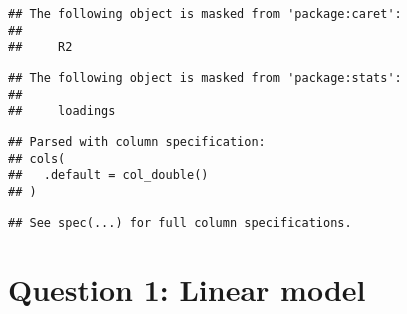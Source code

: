 \documentclass[
]{article}
\newenvironment{Shaded}{\begin{snugshade}}{\end{snugshade}}
\newcommand{\CommentTok}[1]{\textcolor[rgb]{0.56,0.35,0.01}{\textit{#1}}}
\newcommand{\DecValTok}[1]{\textcolor[rgb]{0.00,0.00,0.81}{#1}}
\newcommand{\KeywordTok}[1]{\textcolor[rgb]{0.13,0.29,0.53}{\textbf{#1}}}
\newcommand{\NormalTok}[1]{#1}
\newcommand{\OperatorTok}[1]{\textcolor[rgb]{0.81,0.36,0.00}{\textbf{#1}}}
\newcommand{\StringTok}[1]{\textcolor[rgb]{0.31,0.60,0.02}{#1}}
\begin{document}
\begin{verbatim}
## The following object is masked from 'package:caret':
## 
##     R2
\end{verbatim}

\begin{verbatim}
## The following object is masked from 'package:stats':
## 
##     loadings
\end{verbatim}

\begin{Shaded}
\end{Shaded}

\begin{verbatim}
## Parsed with column specification:
## cols(
##   .default = col_double()
## )
\end{verbatim}

\begin{verbatim}
## See spec(...) for full column specifications.
\end{verbatim}

\begin{Shaded}
\end{Shaded}

\hypertarget{question-1-linear-model}{%
\section{Question 1: Linear model}\label{question-1-linear-model}}
\end{document}
